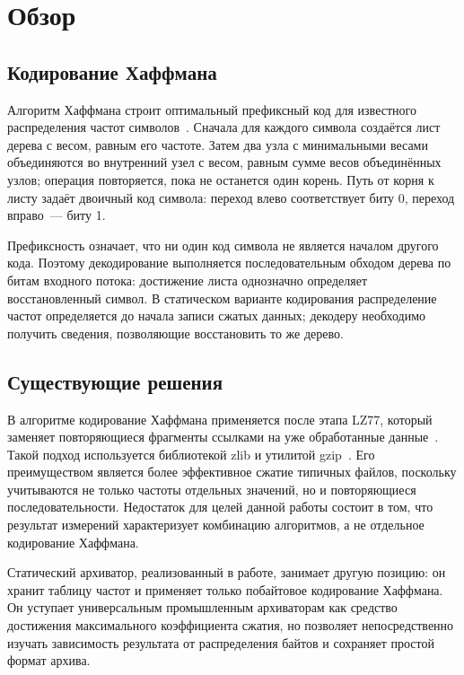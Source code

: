 
\section{Обзор}
\label{sec:related}

\subsection{Кодирование Хаффмана}

Алгоритм Хаффмана строит оптимальный префиксный код для известного
распределения частот символов~\cite{huffman1952}. Сначала для каждого символа
создаётся лист дерева с весом, равным его частоте. Затем два узла с
минимальными весами объединяются во внутренний узел с весом, равным сумме весов
объединённых узлов; операция повторяется, пока не останется один корень. Путь
от корня к листу задаёт двоичный код символа: переход влево соответствует биту
0, переход вправо~--- биту 1.

Префиксность означает, что ни один код символа не является началом другого
кода. Поэтому декодирование выполняется последовательным обходом дерева по
битам входного потока: достижение листа однозначно определяет восстановленный
символ. В статическом варианте кодирования распределение частот определяется
до начала записи сжатых данных; декодеру необходимо получить сведения,
позволяющие восстановить то же дерево.

\subsection{Существующие решения}

В алгоритме \Deflate{} кодирование Хаффмана применяется после этапа
LZ77, который заменяет повторяющиеся фрагменты ссылками на уже обработанные
данные~\cite{rfc1951}. Такой подход используется библиотекой zlib и
утилитой gzip~\cite{zlib,gzip}. Его преимуществом является более эффективное
сжатие типичных файлов, поскольку учитываются не только частоты отдельных
значений, но и повторяющиеся последовательности. Недостаток для целей данной
работы состоит в том, что результат измерений характеризует комбинацию
алгоритмов, а не отдельное кодирование Хаффмана.

Статический архиватор, реализованный в работе, занимает другую позицию: он
хранит таблицу частот и применяет только побайтовое кодирование Хаффмана. Он
уступает универсальным промышленным архиваторам как средство достижения
максимального коэффициента сжатия, но позволяет непосредственно изучать
зависимость результата от распределения байтов и сохраняет простой формат
архива.

